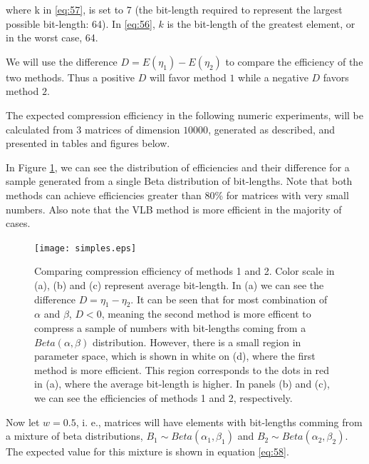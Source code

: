 \documentclass[10pt]{article}
\begin{document}
where k in \ref{eq:57}, is set to 7 (the bit-length required to represent the largest possible bit-length: 64). In \ref{eq:56}, $k$ is the bit-length of the greatest element, or in the worst case, 64.

We will use the difference $D=E(\eta_1)-E(\eta_2)$ to compare the efficiency of the two methods. Thus a positive $D$ will favor method $1$ while a negative $D$ favors method $2$.

The expected compression efficiency in the following numeric experiments, will be calculated from $3$ matrices of dimension $10000$, generated as described, and presented in tables and figures below. 
 
In Figure \ref{fig:03}, we can see the distribution of efficiencies and their difference for a sample generated from a single Beta distribution of bit-lengths. Note that both methods can achieve efficiencies greater than 80\% for matrices with very small numbers. Also note that the VLB method is more efficient in the majority of cases.
 
\begin{figure}[h]
  \centering
  \texttt{[image: simples.eps]}
  \caption{Comparing compression efficiency of methods 1 and 2. Color scale in (a), (b) and (c) represent average bit-length. In (a) we can see the difference $D = \eta_1 - \eta_2$. It can be seen that for most combination of $\alpha$ and $\beta$, $D<0$, meaning the second method is more efficent to compress a sample of numbers with bit-lengths coming from a $Beta(\alpha,\beta)$ distribution. However, there is a small region in parameter space, which is shown in white on (d), where the first method is more efficient. This region corresponds to the dots in red in (a), where the average bit-length is higher. In panels (b) and (c), we can see the efficiencies of methods 1 and 2, respectively.}
  \label{fig:03}
\end{figure}
 
Now let $w = 0.5$, i. e., matrices will have elements with bit-lengths comming from a mixture of beta distributions, $B_1\sim Beta(\alpha_1,\beta_1)$ and $B_2\sim Beta(\alpha_2,\beta_2)$. The expected value for this mixture is shown in equation \ref{eq:58}.
 
\end{document}
